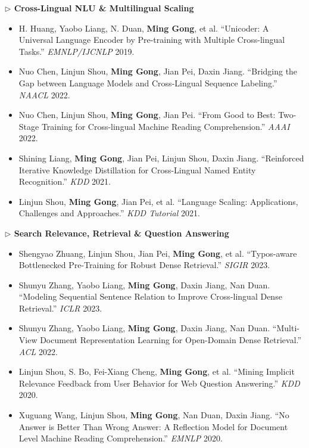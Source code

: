 \documentclass[10.5pt,letterpaper]{article}
\begin{document}
\noindent\textcolor{blue!60!black}{\textbf{$\triangleright$ Cross-Lingual NLU \& Multilingual Scaling}}
\begin{itemize}
  \item H. Huang, Yaobo Liang, N. Duan, \textbf{Ming Gong}, et al. ``Unicoder: A Universal Language Encoder by Pre-training with Multiple Cross-lingual Tasks.'' \textit{EMNLP/IJCNLP} 2019.
  \item Nuo Chen, Linjun Shou, \textbf{Ming Gong}, Jian Pei, Daxin Jiang. ``Bridging the Gap between Language Models and Cross-Lingual Sequence Labeling.'' \textit{NAACL} 2022.
  \item Nuo Chen, Linjun Shou, \textbf{Ming Gong}, Jian Pei. ``From Good to Best: Two-Stage Training for Cross-lingual Machine Reading Comprehension.'' \textit{AAAI} 2022.
  \item Shining Liang, \textbf{Ming Gong}, Jian Pei, Linjun Shou, Daxin Jiang. ``Reinforced Iterative Knowledge Distillation for Cross-Lingual Named Entity Recognition.'' \textit{KDD} 2021.
  \item Linjun Shou, \textbf{Ming Gong}, Jian Pei, et al. ``Language Scaling: Applications, Challenges and Approaches.'' \textit{KDD Tutorial} 2021.
\end{itemize}

\noindent\textcolor{blue!60!black}{\textbf{$\triangleright$ Search Relevance, Retrieval \& Question Answering}}
\begin{itemize}
  \item Shengyao Zhuang, Linjun Shou, Jian Pei, \textbf{Ming Gong}, et al. ``Typos-aware Bottlenecked Pre-Training for Robust Dense Retrieval.'' \textit{SIGIR} 2023.
  \item Shunyu Zhang, Yaobo Liang, \textbf{Ming Gong}, Daxin Jiang, Nan Duan. ``Modeling Sequential Sentence Relation to Improve Cross-lingual Dense Retrieval.'' \textit{ICLR} 2023.
  \item Shunyu Zhang, Yaobo Liang, \textbf{Ming Gong}, Daxin Jiang, Nan Duan. ``Multi-View Document Representation Learning for Open-Domain Dense Retrieval.'' \textit{ACL} 2022.
  \item Linjun Shou, S. Bo, Fei-Xiang Cheng, \textbf{Ming Gong}, et al. ``Mining Implicit Relevance Feedback from User Behavior for Web Question Answering.'' \textit{KDD} 2020.
  \item Xuguang Wang, Linjun Shou, \textbf{Ming Gong}, Nan Duan, Daxin Jiang. ``No Answer is Better Than Wrong Answer: A Reflection Model for Document Level Machine Reading Comprehension.'' \textit{EMNLP} 2020.
\end{itemize}
\end{document}

